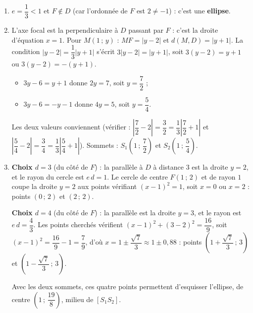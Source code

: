 \documentclass[11pt]{article}
\begin{document}
\begin{corrige}
\begin{enumerate}
\item $e = \dfrac{1}{3} < 1$ et $F \notin D$ (car l'ordonnée de $F$ est $2 \neq -1$) : c'est une \textbf{ellipse}.
\item L'axe focal est la perpendiculaire à $D$ passant par $F$ : c'est la droite d'équation $x = 1$. Pour $M(1\,;\,y)$ : $MF = |y - 2|$ et $d(M, D) = |y + 1|$. La condition $|y-2| = \dfrac{1}{3}|y+1|$ s'écrit $3|y-2| = |y+1|$, soit $3(y-2) = y+1$ ou $3(y-2) = -(y+1)$.
\begin{itemize}
\item $3y - 6 = y + 1$ donne $2y = 7$, soit $y = \dfrac{7}{2}$ ;
\item $3y - 6 = -y - 1$ donne $4y = 5$, soit $y = \dfrac{5}{4}$.
\end{itemize}
Les deux valeurs conviennent (vérifier : $\left|\dfrac72 - 2\right| = \dfrac32 = \dfrac13\left|\dfrac72 + 1\right|$ et $\left|\dfrac54 - 2\right| = \dfrac34 = \dfrac13\left|\dfrac54 + 1\right|$). Sommets : $S_1\left(1\,;\,\dfrac{7}{2}\right)$ et $S_2\left(1\,;\,\dfrac{5}{4}\right)$.
\item \textbf{Choix $d = 3$} (du côté de $F$) : la parallèle à $D$ à distance $3$ est la droite $y = 2$, et le rayon du cercle est $e\,d = 1$. Le cercle de centre $F(1\,;\,2)$ et de rayon $1$ coupe la droite $y = 2$ aux points vérifiant $(x-1)^2 = 1$, soit $x = 0$ ou $x = 2$ : points $(0\,;\,2)$ et $(2\,;\,2)$.

\textbf{Choix $d = 4$} (du côté de $F$) : la parallèle est la droite $y = 3$, et le rayon est $e\,d = \dfrac{4}{3}$. Les points cherchés vérifient $(x-1)^2 + (3-2)^2 = \dfrac{16}{9}$, soit $(x-1)^2 = \dfrac{16}{9} - 1 = \dfrac{7}{9}$, d'où $x = 1 \pm \dfrac{\sqrt{7}}{3} \approx 1 \pm 0,88$ : points $\left(1 + \dfrac{\sqrt{7}}{3}\,;\,3\right)$ et $\left(1 - \dfrac{\sqrt{7}}{3}\,;\,3\right)$.

Avec les deux sommets, ces quatre points permettent d'esquisser l'ellipse, de centre $\left(1\,;\,\dfrac{19}{8}\right)$, milieu de $[S_1S_2]$.
\end{enumerate}
\end{corrige}
\end{document}

